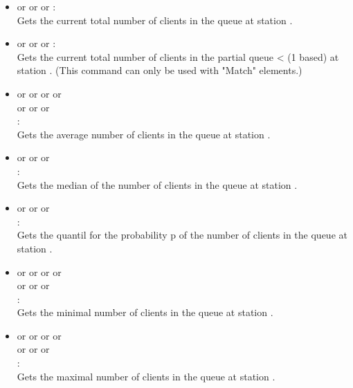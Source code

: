 \begin{itemize}    

\item
{} or  or  or :\\
Gets the current total number of clients in the queue at station .

\item
{} or  or  or :\\
Gets the current total number of clients in the partial queue < (1 based) at station .
(This command can only be used with "Match" elements.)
 
\item
{} or  or  or  or\\
 or  or  or\\
:\\
Gets the average number of clients in the queue at station .

\item
{} or  or  or\\
:\\
Gets the median of the number of clients in the queue at station .

\item
{} or  or  or\\
:\\
Gets the quantil for the probability p of the number of clients in the queue at station .

\item
{} or  or  or  or\\
 or  or  or\\
:\\
Gets the minimal number of clients in the queue at station .

\item
{} or  or  or  or\\
 or  or  or\\
:\\
Gets the maximal number of clients in the queue at station .


\end{itemize}
